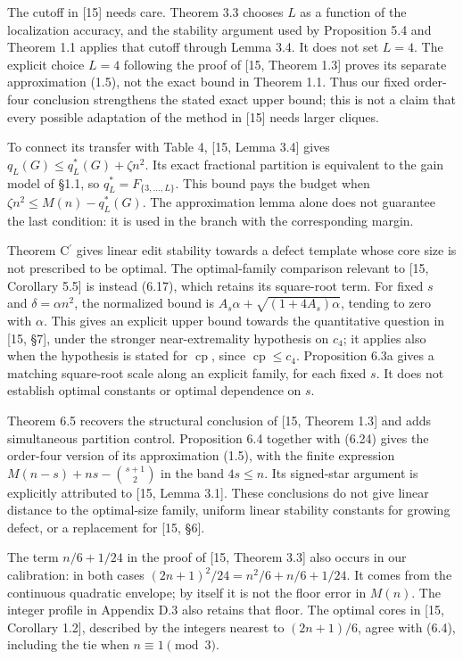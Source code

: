 \documentclass[english,11pt,a4paper]{article}
\begin{document}
The cutoff in {[}15{]} needs care. Theorem 3.3 chooses \(L\) as a function of the localization accuracy, and the stability argument used by Proposition 5.4 and Theorem 1.1 applies that cutoff through Lemma 3.4. It does not set \(L=4\). The explicit choice \(L=4\) following the proof of {[}15, Theorem 1.3{]} proves its separate approximation (1.5), not the exact bound in Theorem 1.1. Thus our fixed order-four conclusion strengthens the stated exact upper bound; this is not a claim that every possible adaptation of the method in {[}15{]} needs larger cliques.

To connect its transfer with Table 4, {[}15, Lemma 3.4{]} gives \(q_L(G)\le q_L^*(G)+\zeta n^2\). Its exact fractional partition is equivalent to the gain model of §1.1, so \(q_L^*=F_{\{3,\ldots,L\}}\). This bound pays the budget when \(\zeta n^2\le M(n)-q_L^*(G)\). The approximation lemma alone does not guarantee the last condition: it is used in the branch with the corresponding margin.

Theorem \texorpdfstring{C\ensuremath{^{\prime}}}{C'} gives linear edit stability towards a defect template whose core size is not prescribed to be optimal. The optimal-family comparison relevant to {[}15, Corollary 5.5{]} is instead (6.17), which retains its square-root term. For fixed \(s\) and \(\delta=\alpha n^2\), the normalized bound is \(A_s\alpha+\sqrt{(1+4A_s)\alpha}\), tending to zero with \(\alpha\). This gives an explicit upper bound towards the quantitative question in {[}15, §7{]}, under the stronger near-extremality hypothesis on \(c_4\); it applies also when the hypothesis is stated for \(\operatorname{cp}\), since \(\operatorname{cp}\le c_4\). Proposition 6.3a gives a matching square-root scale along an explicit family, for each fixed \(s\). It does not establish optimal constants or optimal dependence on \(s\).

Theorem 6.5 recovers the structural conclusion of {[}15, Theorem 1.3{]} and adds simultaneous partition control. Proposition 6.4 together with (6.24) gives the order-four version of its approximation (1.5), with the finite expression \(M(n-s)+ns-\binom{s+1}{2}\) in the band \(4s\le n\). Its signed-star argument is explicitly attributed to {[}15, Lemma 3.1{]}. These conclusions do not give linear distance to the optimal-size family, uniform linear stability constants for growing defect, or a replacement for {[}15, §6{]}.

The term \(n/6+1/24\) in the proof of {[}15, Theorem 3.3{]} also occurs in our calibration: in both cases \((2n+1)^2/24=n^2/6+n/6+1/24\). It comes from the continuous quadratic envelope; by itself it is not the floor error in \(M(n)\). The integer profile in Appendix D.3 also retains that floor. The optimal cores in {[}15, Corollary 1.2{]}, described by the integers nearest to \((2n+1)/6\), agree with (6.4), including the tie when \(n\equiv1\pmod3\).
\end{document}
